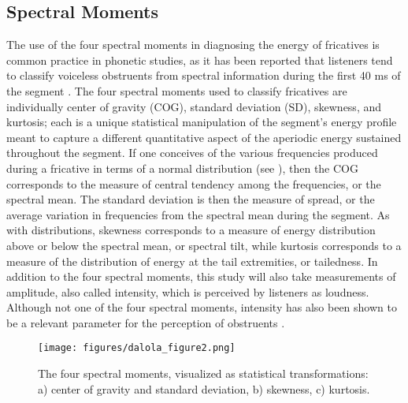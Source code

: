 \documentclass[output=paper,colorlinks,citecolor=brown,draftmode]{langscibook}
\begin{document}
\subsection{Spectral Moments}
The use of the four spectral moments in diagnosing the energy of fricatives is common practice in phonetic studies, as it has been reported that listeners tend to classify voiceless obstruents from spectral information during the first 40 ms of the segment \citep{forrest1988statistical}. The four spectral moments used to classify fricatives are individually center of gravity (COG), standard deviation (SD), skewness, and kurtosis; each is a unique statistical manipulation of the segment’s energy profile meant to capture a different quantitative aspect of the aperiodic energy sustained throughout the segment. If one conceives of the various frequencies produced during a fricative in terms of a normal distribution (see ), then the COG corresponds to the measure of central tendency among the frequencies, or the spectral mean. The standard deviation is then the measure of spread, or the average variation in frequencies from the spectral mean during the segment. As with distributions, skewness corresponds to a measure of energy distribution above or below the spectral mean, or spectral tilt, while kurtosis corresponds to a measure of the distribution of energy at the tail extremities, or tailedness. In addition to the four spectral moments, this study will also take measurements of amplitude, also called intensity, which is perceived by listeners as loudness. Although not one of the four spectral moments, intensity has also been shown to be a relevant parameter for the perception of obstruents \citep{forrest1988statistical}.

\begin{figure}
    \texttt{[image: figures/dalola\_figure2.png]}
    \caption{The four spectral moments, visualized as statistical transformations: a) center of gravity and standard deviation, b) skewness, c) kurtosis.}
    \label{figure2}
\end{figure}
\end{document}

